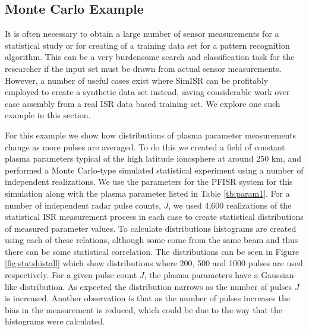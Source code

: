 \subsection{Monte Carlo Example}

It is often necessary to obtain a large number of sensor measurements for a statistical study or for creating of a training data set for a pattern recognition algorithm. This can be a very burdensome search and classification task for the researcher if the input set must be drawn from actual sensor measurements. However, a number of useful cases exist where SimISR can be profitably employed to create a synthetic data set instead, saving considerable work over case assembly from a real ISR data based training set.  We explore one such example in this section.

For this example we show how distributions of plasma parameter measurements change as more pulses are averaged. To do this we created a field of constant plasma parameters typical of the high latitude ionosphere at around 250 km, and performed a Monte Carlo-type simulated statistical experiment using a number of independent realizations. We use the parameters for the PFISR system for this simulation along with the plasma parameter listed in Table \ref{tb:param1}. For a number of independent radar pulse counts, $J$, we used 4,600 realizations of the statistical ISR measurement process in each case to create statistical distributions of measured parameter values. To calculate distributions histograms are created using each of these relations, although some come from the same beam and thus there can be some statistical correlation. The distributions can be seen in Figure \ref{fig:statshistall} which show distributions where 200, 500 and 1000 pulses are used respectively. For a given pulse count $J$, the plasma parameters have a Gaussian-like distribution. As expected the distribution narrows as the number of pulses $J$ is increased. Another observation is that as the number of pulses increases the bias in the measurement is reduced, which could be due to the way that the histograms were calculated.
